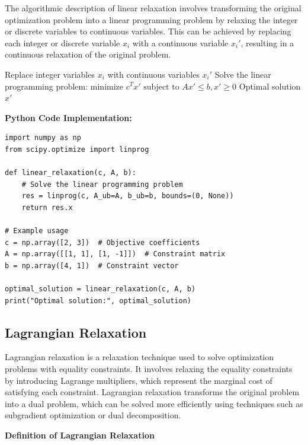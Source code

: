 \documentclass[12pt]{book} %
\begin{document}
The algorithmic description of linear relaxation involves transforming the original optimization problem into a linear programming problem by relaxing the integer or discrete variables to continuous variables. This can be achieved by replacing each integer or discrete variable \(x_i\) with a continuous variable \(x_i'\), resulting in a continuous relaxation of the original problem.
\FloatBarrier
\begin{algorithm}
\caption{Linear Relaxation Algorithm}
\begin{algorithmic}[1]
    \State Replace integer variables $x_i$ with continuous variables $x_i'$
    \State Solve the linear programming problem:
    \State \hspace{\algorithmicindent} $\text{minimize } c^Tx' \text{ subject to } Ax' \leq b, x' \geq 0$
    \State \Return Optimal solution $x'$
\EndFunction
\end{algorithmic}
\end{algorithm}
\FloatBarrier
\textbf{Python Code Implementation:}
\FloatBarrier
\begin{lstlisting}
import numpy as np
from scipy.optimize import linprog

def linear_relaxation(c, A, b):
    # Solve the linear programming problem
    res = linprog(c, A_ub=A, b_ub=b, bounds=(0, None))
    return res.x

# Example usage
c = np.array([2, 3])  # Objective coefficients
A = np.array([[1, 1], [1, -1]])  # Constraint matrix
b = np.array([4, 1])  # Constraint vector

optimal_solution = linear_relaxation(c, A, b)
print("Optimal solution:", optimal_solution)
\end{lstlisting}


\subsection{Lagrangian Relaxation}

Lagrangian relaxation is a relaxation technique used to solve optimization problems with equality constraints. It involves relaxing the equality constraints by introducing Lagrange multipliers, which represent the marginal cost of satisfying each constraint. Lagrangian relaxation transforms the original problem into a dual problem, which can be solved more efficiently using techniques such as subgradient optimization or dual decomposition.

\textbf{Definition of Lagrangian Relaxation}
\end{document}
